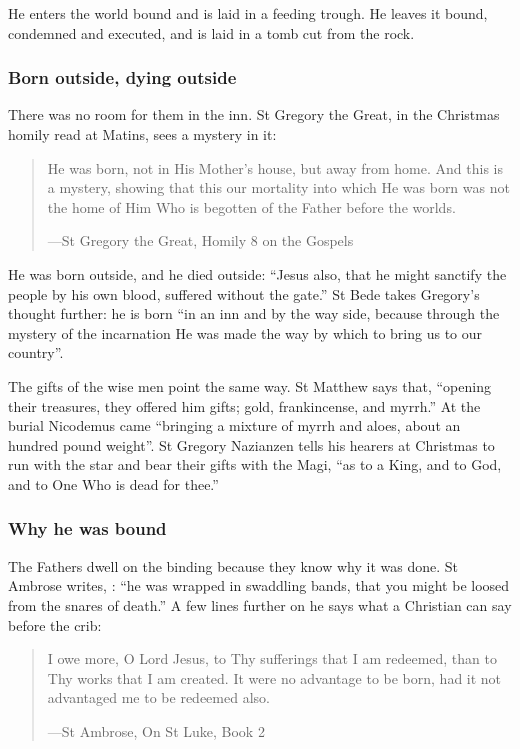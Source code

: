 He enters the world bound and is laid in a feeding trough. He leaves it bound,
condemned and executed, and is laid in a tomb cut from the rock.

\subsubsection*{Born outside, dying outside}

There was no room for them in the inn. St Gregory the Great, in the Christmas
homily read at Matins, sees a mystery in it:

\begin{quote}
He was born, not in His Mother's house, but away from home. And this is a
mystery, showing that this our mortality into which He was born was not the home
of Him Who is begotten of the Father before the worlds.\par
{\smallskip\noindent\small ---St Gregory the Great, Homily 8 on the Gospels\par}
\end{quote}

He was born outside, and he died outside: ``Jesus also, that he might sanctify
the people by his own blood, suffered without the gate.'' St Bede takes
Gregory's thought further: he is born ``in an inn and by the way side, because
through the mystery of the incarnation He was made the way by which to bring us
to our country''.

The gifts of the wise men point the same way. St Matthew says that,
``opening their treasures, they offered him gifts; gold, frankincense, and
myrrh.'' At the burial Nicodemus came ``bringing a mixture of myrrh and aloes,
about an hundred pound weight''. St Gregory Nazianzen tells his hearers at
Christmas to run with the star and bear their gifts with the Magi, ``as to a
King, and to God, and to One Who is dead for thee.''

\subsubsection*{Why he was bound}

The Fathers dwell on the binding because they know why it was done. St Ambrose
writes, : ``he was
wrapped in swaddling bands, that you might be loosed from the snares of
death.'' A few lines further on he says what a Christian can say before the crib:

\begin{quote}
I owe more, O Lord Jesus, to Thy sufferings that I am redeemed, than to Thy
works that I am created. It were no advantage to be born, had it not advantaged
me to be redeemed also.\par
{\smallskip\noindent\small ---St Ambrose, On St Luke, Book 2\par}
\end{quote}

